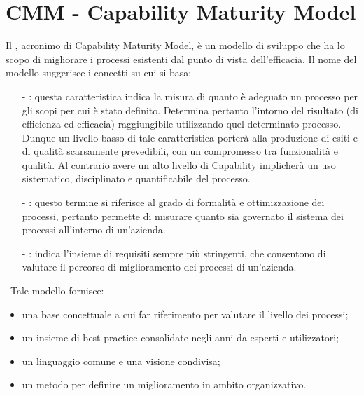 \documentclass[a4paper, titlepage]{article}
\begin{document}
\section{CMM - Capability Maturity Model}
\label{app:CMM}
Il , acronimo di Capability Maturity Model, è un modello di sviluppo che ha lo scopo di migliorare i processi  esistenti dal punto di vista dell'efficacia.
\newline Il nome del modello suggerisce i concetti su cui si basa:
\begin{itemize}
\item[-]: questa caratteristica indica la misura di quanto è adeguato un processo per gli scopi per cui è stato definito.
Determina pertanto l’intorno del risultato (di efficienza ed efficacia)
raggiungibile utilizzando quel determinato processo.
\newline Dunque un livello basso di tale caratteristica porterà alla produzione di esiti e di qualità scarsamente prevedibili, con un compromesso tra funzionalità e qualità. Al contrario avere un alto livello di Capability implicherà un uso sistematico, disciplinato e quantificabile del processo.
\item[-]: questo termine si riferisce al grado di formalità e ottimizzazione dei processi, pertanto permette di misurare quanto sia governato il sistema dei processi all'interno di un'azienda.
\item[-]: indica l'insieme di requisiti sempre più stringenti, che consentono di valutare il percorso di miglioramento dei processi di un’azienda.
\end{itemize}
\ 
\newline Tale modello fornisce:
\begin{itemize}
\item una base concettuale a cui far riferimento per valutare il livello dei processi;
\item un insieme di best practice consolidate negli anni da esperti e utilizzatori;
\item un linguaggio comune e una visione condivisa;
\item un metodo per definire un miglioramento in ambito organizzativo.
\end{itemize}
\end{document}
